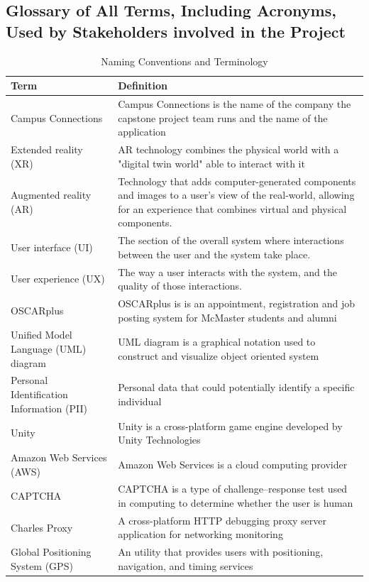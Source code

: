 \documentclass[12pt]{article}
\begin{document}
\subsection{Glossary of All Terms, Including Acronyms, Used by Stakeholders
involved in the Project}
\begin{table}[H]
    \centering
    \begin{tabular}{|p{0.3\linewidth} | p{0.7\linewidth}| }
    \hline
    \textbf{Term} & \textbf{Definition}\\
    \hline
    Campus Connections & Campus Connections is the name of the company the capstone project team runs and the name of the application\\
    \hline
    Extended reality (XR) & AR technology combines the physical world with a "digital twin world" able to interact with it\\
    \hline
    Augmented reality (AR) & Technology that adds computer-generated components and images to a user’s view of the real-world, allowing for an experience that combines virtual and physical components.\\
    \hline
    User interface (UI) & The section of the overall system where interactions between the user and the system take place.\\
    \hline
    User experience (UX) & The way a user interacts with the system, and the quality of those interactions.\\
    \hline
    OSCARplus & OSCARplus is is an appointment, registration and job posting system for McMaster students and alumni\\
    \hline
    Unified Model Language (UML) diagram & UML diagram is a graphical notation used to construct and visualize object oriented system\\
    \hline
    Personal Identification Information (PII) & Personal data that could potentially identify a specific individual\\
    \hline
    Unity & Unity is a cross-platform game engine developed by Unity Technologies\\
    \hline
    Amazon Web Services (AWS) & Amazon Web Services is a cloud computing provider\\
    \hline
    CAPTCHA & CAPTCHA is a type of challenge–response test used in computing to determine whether the user is human\\
    \hline
    Charles Proxy & A cross-platform HTTP debugging proxy server application for networking monitoring\\
    \hline
    Global Positioning System (GPS) & An utility that provides users with positioning, navigation, and timing services\\
    \hline
    \end{tabular}
    \caption{Naming Conventions and Terminology}
    \label{TblNaming}
\end{table}
\end{document}
